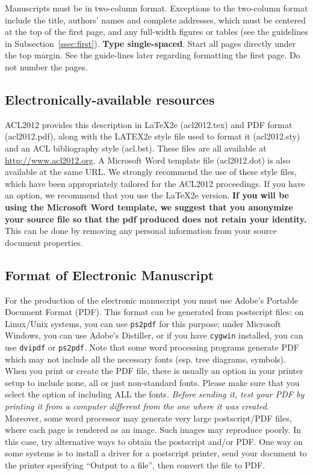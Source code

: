 \documentclass[11pt]{article}
\begin{document}
Manuscripts must be in two-column format. Exceptions to the two-column format include the title, 
authors' names and complete addresses, which must be centered at the top of the first page, 
and any full-width figures or tables (see the guidelines in Subsection~\ref{ssec:first}). {\bf Type single-spaced}. 
Start all pages directly under the top margin. See the guide-lines later regarding formatting the first page. Do not number the pages.

\subsection{Electronically-available resources}

ACL2012 provides this description in \LaTeX2e (acl2012.tex) and PDF format (acl2012.pdf), along with the LATEX2e style file used to format it (acl2012.sty) and an ACL bibliography style (acl.bst). These files are all available at \url{http://www.acl2012.org}.  A Microsoft Word template file (acl2012.dot) is also available at the same URL. We strongly recommend the use of these style files, which have been appropriately tailored for the ACL2012 proceedings. If you have an option, we recommend that you use the \LaTeX2e version. \textbf{If you will be using the Microsoft Word template, we suggest that you anonymize your source file so that the pdf produced does not retain your identity.} This can be done by removing any personal information from your source
document properties.


\subsection{Format of Electronic Manuscript}
\label{sect:pdf}

For the production of the electronic manuscript you must use Adobe's
Portable Document Format (PDF). This format can be generated from
postscript files: on Linux/Unix systems, you can use {\tt ps2pdf} for this
purpose; under Microsoft Windows, you can use Adobe's Distiller, or
if you have {\tt cygwin} installed, you can use {\tt dvipdf} or
{\tt ps2pdf}.  Note
that some word processing programs generate PDF which may not include
all the necessary fonts (esp. tree diagrams, symbols). When you print
or create the PDF file, there is usually an option in your printer
setup to include none, all or just non-standard fonts.  Please make
sure that you select the option of including ALL the fonts.  {\em Before sending it, test your PDF by printing it from a computer different from the one where it was created}. Moreover,
some word processor may generate very large postscript/PDF files,
where each page is rendered as an image. Such images may reproduce
poorly.  In this case, try alternative ways to obtain the postscript
and/or PDF.  One way on some systems is to install a driver for a
postscript printer, send your document to the printer specifying
``Output to a file'', then convert the file to PDF.
\end{document}
